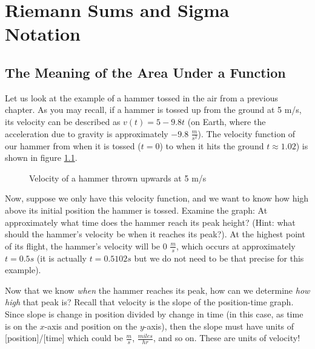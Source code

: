 \chapter{Riemann Sums and Sigma Notation}
\section{The Meaning of the Area Under a Function}

Let us look at the example of a hammer tossed in the air from a previous chapter. As you may recall, if a hammer is tossed up from the ground at 5 m/s, its velocity can be described as $v(t) = 5-9.8t$ (on Earth, where the acceleration due to gravity is approximately $-9.8$ $\frac{m}{s^2}$). The velocity function of our hammer from when it is tossed ($t=0$) to when it hits the ground $t\approx1.02$) is shown in figure \ref{fig:hammer-riemann_sums}.

\begin{figure}[H]
	\centering
	\caption{Velocity of a hammer thrown upwards at 5 m/s}
	\label{fig:hammer-riemann_sums}
\end{figure}

Now, suppose we only have this velocity function, and we want to know how high above its initial position the hammer is tossed. Examine the graph: At approximately what time does the hammer reach its peak height? (Hint: what should the hammer's velocity be when it reaches its peak?). At the highest point of its flight, the hammer's velocity will be $0$ $\frac{m}{s}$, which occurs at approximately $t=0.5s$ (it is actually $t=0.5102s$ but we do not need to be that precise for this example).

Now that we know \textit{when} the hammer reaches its peak, how can we determine \textit{how high} that peak is? Recall that velocity is the slope of the position-time graph. Since slope is change in position divided by change in time (in this case, as time is on the $x$-axis and position on the $y$-axis), then the slope must have units of [position]/[time] which could be $\frac{m}{s}$, $\frac{miles}{hr}$, and so on. These are units of velocity!

